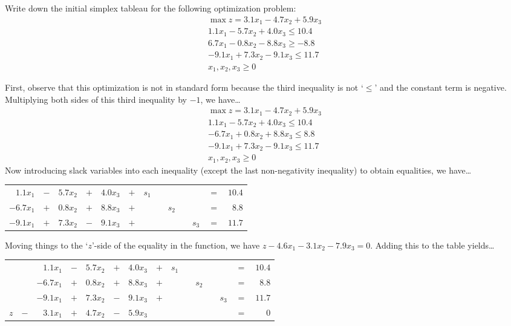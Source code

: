 \documentclass[11pt,letterpaper]{article}
\begin{document}

 Write down the initial simplex tableau for the following optimization problem:
	\[
	\begin{gathered}
	\max z= 3.1x_1 - 4.7x_2 + 5.9x_3 \\
	1.1x_1 - 5.7x_2 + 4.0x_3 \leq 10.4 \\
	6.7x_1 - 0.8x_2 - 8.8x_3 \geq -8.8 \\
	-9.1x_1 + 7.3x_2 - 9.1x_3 \leq 11.7 \\
	x_1, x_2, x_3 \geq 0
	\end{gathered}
	\] \pspace

\sol First, observe that this optimization is not in standard form because the third inequality is not `$\leq$' and the constant term is negative. Multiplying both sides of this third inequality by $-1$, we have\dots 
	\[
	\begin{gathered}
	\max z= 3.1x_1 - 4.7x_2 + 5.9x_3 \\
	1.1x_1 - 5.7x_2 + 4.0x_3 \leq 10.4 \\
	-6.7x_1 + 0.8x_2 + 8.8x_3 \leq 8.8 \\
	-9.1x_1 + 7.3x_2 - 9.1x_3 \leq 11.7 \\
	x_1, x_2, x_3 \geq 0
	\end{gathered}
	\] 
Now introducing slack variables into each inequality (except the last non-negativity inequality) to obtain equalities, we have\dots \par
	\begin{table}[!ht]
	\centering
	\begin{tabular}{rrrrrrrrrrrrr}
	$1.1x_1$ & $-$ & $5.7x_2$ & $+$ & $4.0x_3$ & $+$ & $s_1$ & & & & & $=$ & $10.4$ \\
	$-6.7x_1$ & $+$ & $0.8x_2$ & $+$ & $8.8x_3$ & $+$ & & & $s_2$ & & & $=$ & $8.8$ \\
	$-9.1x_1$ & $+$ & $7.3x_2$ & $-$ & $9.1x_3$ & $+$ & & & & & $s_3$ & $=$ & $11.7$ \\
	\end{tabular}
	\end{table} \par
Moving things to the `$z$'-side of the equality in the function, we have $z - 4.6x_1 - 3.1x_2 - 7.9x_3= 0$. Adding this to the table yields\dots \par
	\begin{table}[!ht]
	\centering
	\begin{tabular}{rrrrrrrrrrrrrrr}
	&& $1.1x_1$ & $-$ & $5.7x_2$ & $+$ & $4.0x_3$ & $+$ & $s_1$ & & & & & $=$ & $10.4$ \\
	&& $-6.7x_1$ & $+$ & $0.8x_2$ & $+$ & $8.8x_3$ & $+$ & & & $s_2$ & & & $=$ & $8.8$ \\
	&& $-9.1x_1$ & $+$ & $7.3x_2$ & $-$ & $9.1x_3$ & $+$ & & & & & $s_3$ & $=$ & $11.7$ \\
	$z$ & $-$ & $3.1x_1$ & $+$ & $4.7x_2$ & $-$ & $5.9x_3$ & & & & & & & $=$ & $0$ \\
	\end{tabular}
	\end{table} \par
\end{document}
